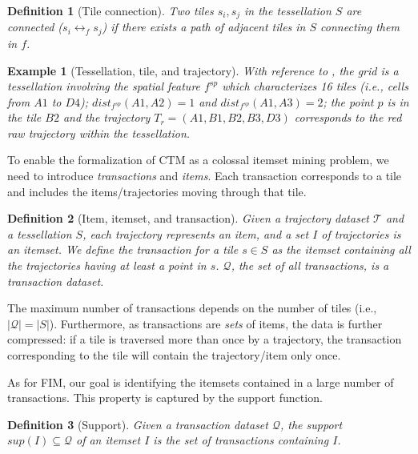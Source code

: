 \documentclass[preprint,12pt,authoryear]{elsarticle} %
\newtheorem{example}{Example}
\newtheorem{definition}{Definition}
\begin{document}
\begin{definition}[Tile connection]\label{def:adj} 
Two tiles $s_i,s_j$ in the tessellation $S$ are  \textit{connected} ($s_i \leftrightarrow_{f} s_j$) if there exists a path of adjacent tiles in $S$ connecting them in $f$.
\end{definition}

\begin{example}[Tessellation, tile, and trajectory]\label{ex:trajabst}
With reference to , the grid is a tessellation involving the spatial feature $f^{sp}$ which characterizes 16 tiles (i.e., cells from $A1$ to $D4$); $dist_{f^{sp}}(A1,A2) = 1$ and $dist_{f^{sp}}(A1,A3) = 2$; the point 
$p$ is in the tile $B2$ and the trajectory $T_r=(A1,B1,B2,B3,D3)$ corresponds to the red raw trajectory within the tessellation.
\end{example}

To enable the formalization of CTM as a colossal itemset mining problem, we need to introduce \textit{transactions} and \textit{items}.
Each transaction corresponds to a tile and includes the items/trajectories moving through that tile.

\begin{definition}[Item, itemset, and transaction] Given a trajectory dataset $\mathcal{T}$ and a tessellation $S$, each trajectory represents an \textit{item}, and a set $I$ of trajectories is an \textit{itemset}.
We define the \textit{transaction} for a tile $s \in S$ as the itemset containing all the trajectories having at least a point in $s$.
$\mathcal{Q}$, the set of all transactions, is a transaction dataset.
\end{definition}

The maximum number of transactions depends on the number of tiles (i.e., $|\mathcal{Q}| = |S|$).
Furthermore, as transactions are \textit{sets} of items, the data is further compressed: if a tile is traversed more than once by a trajectory, the transaction corresponding to the tile will contain the trajectory/item only once.

As for FIM, our goal is identifying the itemsets contained in a large number of transactions.
This property is captured by the support function.

\begin{definition}[Support]
Given a transaction dataset $\mathcal{Q}$, the \textit{support} $sup(I)\subseteq\mathcal{Q}$ of an itemset $I$ is the set of transactions containing $I$.
\end{definition}
\end{document}
